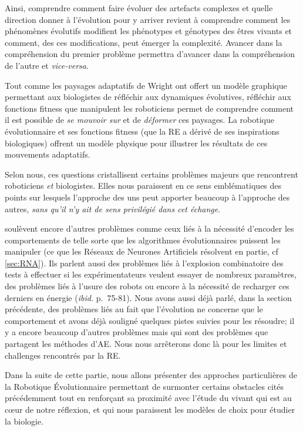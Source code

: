 Ainsi, comprendre comment faire évoluer des artefacts complexes et quelle direction donner à l'évolution pour y arriver revient à comprendre comment les phénomènes évolutifs modifient les phénotypes et génotypes des êtres vivants et comment, des ces modifications, peut émerger la complexité. Avancer dans la compréhension du premier problème permettra d'avancer dans la compréhension de l'autre et \emph{vice-versa}.

Tout comme les paysages adaptatifs de Wright ont offert un modèle graphique permettant aux biologistes de réfléchir aux dynamiques évolutives, réfléchir aux fonctions fitness que manipulent les roboticiens permet de comprendre comment il est possible de \emph{se mouvoir sur} et de \emph{déformer} ces paysages. La robotique évolutionnaire et ses fonctions fitness (que la RE a dérivé de ses inspirations biologiques) offrent un modèle physique pour illustrer les résultats de ces mouvements adaptatifs.

Selon nous, ces questions cristallisent certains problèmes majeurs que rencontrent roboticiens \emph{et} biologistes. Elles nous paraissent en ce sens emblématiques des points sur lesquels l'approche des uns peut apporter beaucoup à l'approche des autres, \emph{sans qu'il n'y ait de sens privilégié dans cet échange}.

\cite{mataric96challengesinevolvingcontrollersforphysicalrobots} soulèvent encore d'autres problèmes comme ceux liés à la nécessité d'encoder les comportements de telle sorte que les algorithmes évolutionnaires puissent les manipuler (ce que les Réseaux de Neurones Artificiels résolvent en partie, cf \ref{sec:RNA}). Ils parlent aussi des problèmes liés à l'explosion combinatoire des tests à effectuer si les expérimentateurs veulent essayer de nombreux paramètres, des problèmes liés à l'usure des robots ou encore à la nécessité de recharger ces derniers en énergie (\emph{ibid.} p.~75-81).  Nous avons aussi déjà parlé, dans la section précédente, des problèmes liés au fait que l'évolution ne concerne que le comportement et avons déjà souligné quelques pistes suivies pour les résoudre;  il y a encore beaucoup d'autres problèmes mais qui sont des problèmes que partagent les méthodes d'AE. Nous nous arrêterons donc là pour les limites et challenges rencontrés par la RE.

Dans la suite de cette partie, nous allons présenter des approches particulières de la Robotique \'Evolutionnaire  permettant de surmonter certains obstacles cités précédemment tout en renforçant sa proximité avec l'étude du vivant qui est au c{\oe}ur de notre réflexion, et qui nous paraissent les modèles de choix pour étudier la biologie.

